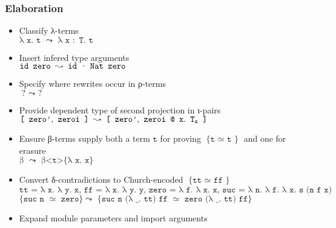 \documentclass[11pt]{beamer}
\newcommand{\mycedtext}[1]{\emph{$\texttt{{#1}}$}}
\begin{document}
\begin{frame}
\frametitle{Elaboration}

\begin{itemize}
\item Classify λ-terms \\
\quad \mycedtext{λ x$.$ t  $\leadsto$  λ x $:$ T$.$ t}
\pause
\item Insert infered type arguments \\
\quad \mycedtext{id zero  $\leadsto$  id \textcolor{darkgray}{·} Nat zero}
\pause
\item Specify where rewrites occur in ρ-terms \\
\quad \mycedtext{?  $\leadsto$  ?}
\pause
\item Provide dependent type of second projection in ι\hspace{0.02cm}-pairs \\
\quad \mycedtext{[ zero\textcolor{darkgray}{'}$,$ zeroi ]  $\leadsto$  [ zero\textcolor{darkgray}{'}$,$ zeroi @ x$.$ T\textsubscript{x} ]}
\pause
\item Ensure β-terms supply both a term \mycedtext{t} for proving \mycedtext{\{ t $\simeq$ t \}} and one for erasure \\
\quad \mycedtext{β  $\leadsto$  β<t>\{λ x$.$ x\}}
\pause
\item Convert δ-contradictions to Church-encoded \mycedtext{\{ tt $\simeq$ ff \}} \\
\tiny{\mycedtext{tt = λ x$.$ λ y$.$ x, ff = λ x$.$ λ y$.$ y, zero = λ f$.$ λ x$.$ x, suc = λ n$.$ λ f$.$ λ x$.$ s (n f x)}} \\
\footnotesize{\mycedtext{\{suc n $\simeq$ zero\} $\leadsto$ \{suc n (λ \_$.$ tt) ff $\simeq$ zero (λ \_$.$ tt) ff\}}}
\pause
\item \normalsize{Expand module parameters and import arguments}
\end{itemize}

\end{frame}

\end{document}
